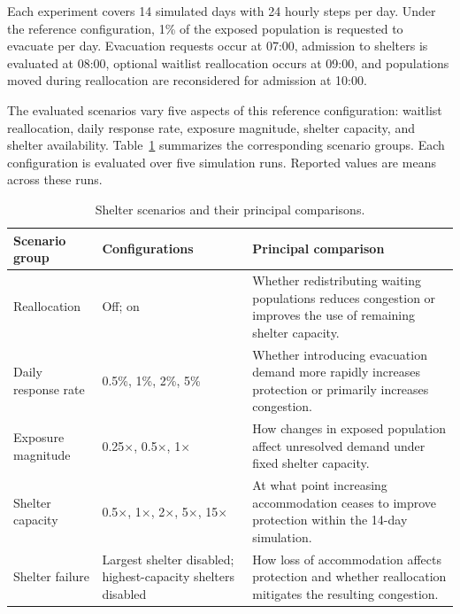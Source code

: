 Each experiment covers 14 simulated days with 24 hourly steps per day. Under the reference configuration, 1\% of the exposed population is requested to evacuate per day. Evacuation requests occur at 07:00, admission to shelters is evaluated at 08:00, optional waitlist reallocation occurs at 09:00, and populations moved during reallocation are reconsidered for admission at 10:00.

The evaluated scenarios vary five aspects of this reference configuration: waitlist reallocation, daily response rate, exposure magnitude, shelter capacity, and shelter availability. Table~\ref{tbl:shelter_scenarios} summarizes the corresponding scenario groups. Each configuration is evaluated over five simulation runs. Reported values are means across these runs.%

\begin{table}[ht]
\centering
\footnotesize
\caption{Shelter scenarios and their principal comparisons.}
\label{tbl:shelter_scenarios}
\begin{tabularx}{\linewidth}{@{}p{3.1cm}p{3.0cm}X@{}}
\toprule
\textbf{Scenario group} &
\textbf{Configurations} &
\textbf{Principal comparison} \\
\midrule

Reallocation
& Off; on
& Whether redistributing waiting populations reduces congestion or improves the use of remaining shelter capacity. \\

Daily response rate
& 0.5\%, 1\%, 2\%, 5\%
& Whether introducing evacuation demand more rapidly increases protection or primarily increases congestion. \\

Exposure magnitude
& 0.25$\times$, 0.5$\times$, 1$\times$
& How changes in exposed population affect unresolved demand under fixed shelter capacity. \\

Shelter capacity
& 0.5$\times$, 1$\times$, 2$\times$, 5$\times$, 15$\times$
& At what point increasing accommodation ceases to improve protection within the 14-day simulation. \\

Shelter failure
& Largest shelter disabled; highest-capacity shelters disabled
& How loss of accommodation affects protection and whether reallocation mitigates the resulting congestion. \\

\bottomrule
\end{tabularx}
\end{table}

